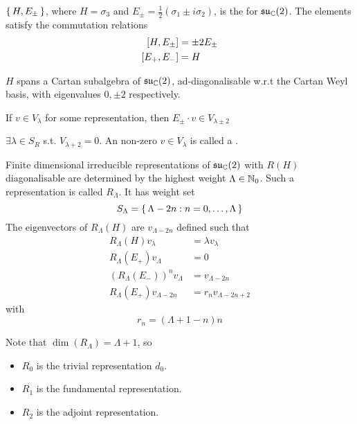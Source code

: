 \documentclass{article}
\begin{document}
\begin{definition}
	$\set{  H, E_\pm  }$, where $H=\sigma_3$ and $E_\pm=\frac{1}{2}(\sigma_1\pm i\sigma_2 )$, is the  for $\mf{su}_\mbb{C}(2)$. The elements satisfy the commutation relations 
	\begin{align*}
		\comm[H]{E_\pm} &= \pm 2E_\pm \\
		\comm[E_+]{E_-} &= H
	\end{align*}
\end{definition} 

\begin{fact}
	$H$ spans a Cartan subalgebra of $\mf{su}_\mbb{C}(2)$, ad-diagonalisable w.r.t the Cartan Weyl basis, with eigenvalues $0, \pm 2$ respectively. 
\end{fact}

\begin{lemma}
	If $v \in V_\lambda$ for some representation, then $E_\pm \cdot v \in V_{\lambda\pm 2}$
\end{lemma}
\begin{corollary}
	$\exists \lambda \in S_R$ s.t. $V_{\lambda+2}=0$. An non-zero $v\in V_\lambda$ is called a . 
\end{corollary}

\begin{theorem}
	Finite dimensional irreducible representations of $\mf{su}_\mbb{C}(2)$ with $R(H)$ diagonalisable are determined by the highest weight $\Lambda\in\mbb{N}_0$. Such a representation is called $R_\Lambda$. It has weight set 
	\[
	S_\Lambda=\set{  \Lambda-2n : n=0,\dots,\Lambda  }
	\]
	The eigenvectors of $R_\Lambda(H)$ are $v_{\Lambda-2n}$ defined such that 
	\begin{align*}
		R_\Lambda(H) v_\lambda &= \lambda v_\lambda \\
		R_\Lambda(E_+) v_\Lambda &= 0 \\
		\left(R_\Lambda(E_-)\right)^n v_{\Lambda} &= v_{\Lambda-2n} \\
		R_\Lambda(E_+) v_{\Lambda-2n} &= r_n v_{\Lambda-2n+2}
	\end{align*}
	with 
	\[
	r_n=(\Lambda+1-n)n
	\]
\end{theorem}
Note that $\dim(R_\Lambda)=\Lambda+1$, so 
\begin{itemize}
	\item $R_0$ is the trivial representation $d_0$.
	\item $R_1$ is the fundamental representation.
	\item $R_2$ is the adjoint representation. 
\end{itemize}
\end{document}
